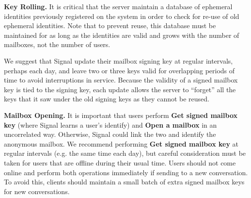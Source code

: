 \medskip \noindent
\textbf{Key Rolling.}\label{ssec:signal-keyrolling}
It is critical that the server maintain a
database of ephemeral identities previously registered on the system
in order to check for re-use of old ephemeral identities.
Note that to 
prevent reuse, this database must be maintained for as long as the
identities are valid and grows with the number of mailboxes, not the
number of users.

We suggest that Signal update their mailbox signing key at regular
intervals, perhaps each day, and leave two or three keys valid for overlapping
periods of time to avoid interruptions in service.
Because the validity of a signed
mailbox key is tied to the signing key, each update allows the server to
``forget'' all the keys
that it saw under the old signing keys as they cannot be reused.


\medskip \noindent
\textbf{Mailbox Opening.}
It is important that users perform {\bf Get signed mailbox key} (where Signal
learns a user's identify) and {\bf Open a mailbox} in an uncorrelated way.
Otherwise, Signal could link the two and identify the anonymous mailbox.
We recommend performing {\bf Get signed mailbox key} at regular intervals (e.g.
the same time each day), but careful consideration must be taken for users
that are offline during their usual time. Users should not come online and
perform both operations immediately if sending to a new conversation. To avoid this,
clients should maintain a small batch of extra signed mailbox keys for new
conversations.


